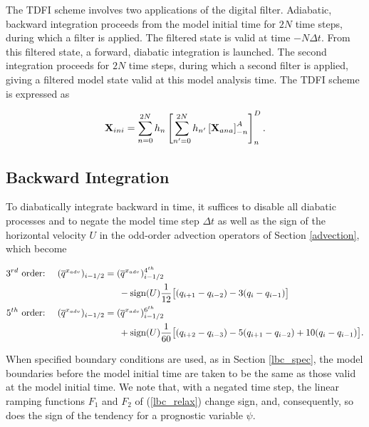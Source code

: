 The TDFI scheme involves two applications of the digital filter. Adiabatic, 
backward integration proceeds from the model initial time for $2N$ time steps, 
during which a filter is applied. The filtered state is valid at time $-N \Delta t$. 
From this filtered state, a forward, diabatic integration is launched. The 
second integration proceeds for $2N$ time steps, during which a second filter 
is applied, giving a filtered model state valid at this model analysis time. 
The TDFI scheme is expressed as

\begin{equation}
{\bf X}_{ini} = \sum_{n=0}^{2N} h_n \left[    \sum_{n'=0}^{2N} h_{n'} \left[ {\bf X}_{ana} \right]_{-n}^A \right]_n^D.
\end{equation}

\subsection{Backward Integration}

To diabatically integrate backward in time, it suffices to disable all 
diabatic processes and to negate the model time step $\Delta t$ as well as 
the sign of the horizontal velocity $U$ in the odd-order advection 
operators of Section \ref{advection}, which become

\begin{align}
\hbox{3}^{rd} \hbox{ order:} ~~~~ & 
(\overline{q}^{x_{adv}})_{i-1/2} = 
(\overline{q}^{x_{adv}})_{i-1/2}^{4^{th}} 
\notag
\\
&~~~~~~~~~~~~~~~~~~~~
- \hbox{sign}(U){1 \over 12} \bigl[
(q_{i+1}-q_{i-2}) - 3(q_i - q_{i-1}) \bigr]
\notag
\\
\hbox{5}^{th} \hbox{ order:} ~~~~ & 
(\overline{q}^{x_{adv}})_{i-1/2} = 
(\overline{q}^{x_{adv}})_{i-1/2}^{6^{th}} 
\notag
\\
&~~~~~~~~~~~~~~~~~~~~
+ \hbox{sign}(U){1 \over 60} \bigl[
(q_{i+2}-q_{i-3}) - 5(q_{i+1} - q_{i-2}) 
+ 10(q_i - q_{i-1})
\bigr].
\notag
\end{align}

When specified boundary conditions are used, as in Section \ref{lbc_spec}, 
the model boundaries before the model initial time are taken to be the same 
as those valid at the model initial time. We note that, with a negated time 
step, the linear ramping functions $F_1$ and $F_2$ of (\ref{lbc_relax}) 
change sign, and, consequently, so does the sign of the tendency for a 
prognostic variable $\psi$.
